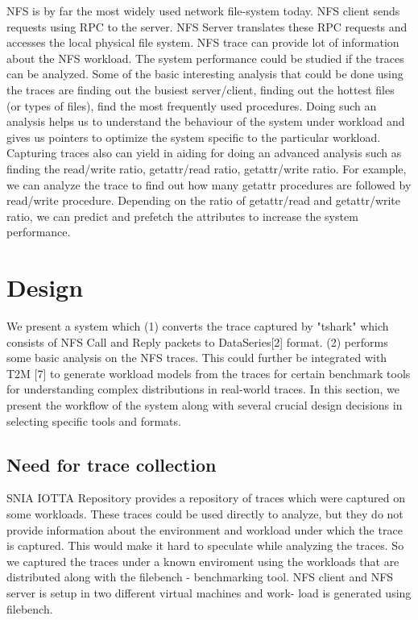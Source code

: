 \documentclass[conference]{IEEEtran}
\begin{document}
\indent
NFS is by far the most widely used network file-system today. NFS client
sends requests using RPC to the server. NFS Server translates these RPC
requests and accesses the local physical file system. NFS trace can provide 
lot of information about the NFS workload. The system performance could be 
studied if the traces can be analyzed. Some of the basic interesting analysis 
that could be done using the traces are finding out the busiest server/client, 
finding out the hottest files (or types of files), find the most frequently used 
procedures. Doing such an analysis helps us to understand the behaviour of 
the system under workload and gives us pointers to optimize the system 
specific to the particular workload. Capturing traces also can yield in aiding for 
doing an advanced analysis such as finding the read/write ratio, getattr/read ratio, 
getattr/write ratio. For example, we can analyze the trace to find out how many 
getattr procedures are followed by read/write procedure. Depending on the ratio 
of getattr/read and getattr/write ratio, we can predict and prefetch the attributes 
to increase the system performance.

\section{Design}
We present a system which (1) converts the trace captured by "tshark" which consists of NFS Call and Reply packets
to DataSeries[2] format. (2)  performs some basic analysis on the NFS traces. This could further be integrated with T2M [7] to generate workload models from the traces for certain benchmark tools for understanding complex distributions in real-world traces. In this section, we present the workflow of the system along with several crucial design decisions in selecting specific tools and formats.

\subsection{Need for trace collection}
SNIA IOTTA Repository provides a repository of traces which
were captured on some workloads. These traces could be used directly to
analyze, but they do not provide information about the environment and
workload under which the trace is captured. This would make it hard to
speculate while analyzing the traces. So we captured the
traces under a known enviroment using the workloads that are distributed along with the filebench - benchmarking tool. NFS client
and NFS server is setup in two different virtual machines and work-
load is generated using filebench.
\end{document}
